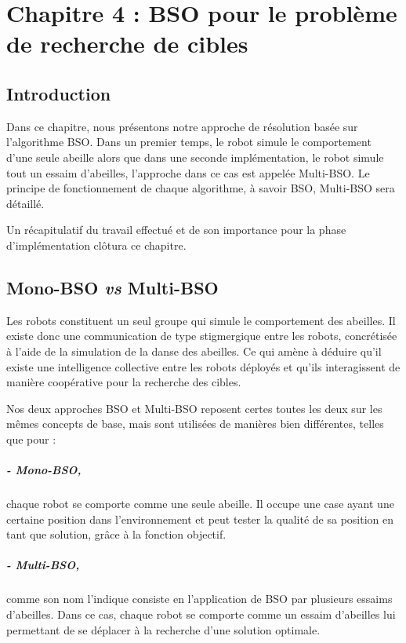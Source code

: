 
\chapter{Chapitre 4 : BSO pour le problème de recherche de cibles} %

\label{Chapter4} %
\section{Introduction}
Dans ce chapitre, nous présentons notre approche de résolution basée sur l’algorithme BSO. Dans un premier temps, le robot simule le comportement d’une seule abeille alors que dans une seconde implémentation, le robot simule tout un essaim d’abeilles, l’approche dans ce cas est appelée Multi-BSO. Le principe de fonctionnement de chaque algorithme, à savoir BSO, Multi-BSO sera détaillé.

Un récapitulatif du travail effectué et de son importance pour la phase d’implémentation clôtura ce chapitre.




\section{Mono-BSO \textit{vs} Multi-BSO}
Les robots constituent un seul groupe qui simule le comportement des abeilles. Il existe donc une communication de type stigmergique entre les robots, concrétisée à l’aide de la simulation de la danse des abeilles. Ce qui amène à déduire qu’il existe une intelligence collective entre les robots déployés et qu'ils interagissent de manière coopérative pour la recherche des cibles.

Nos deux approches BSO et Multi-BSO reposent certes toutes les deux sur les mêmes concepts de base, mais sont utilisées de manières bien différentes, telles que pour :  
\paragraph{- Mono-BSO,}chaque robot se comporte comme une seule abeille. Il occupe une case ayant une certaine position dans l’environnement et peut tester la qualité de sa position en tant que solution, grâce à la fonction objectif.

\paragraph{- Multi-BSO,}comme son nom l’indique consiste en l’application de BSO par plusieurs essaims d’abeilles. Dans ce cas, chaque robot se comporte comme un essaim d’abeilles lui permettant de se déplacer à la recherche d'une solution optimale. 




